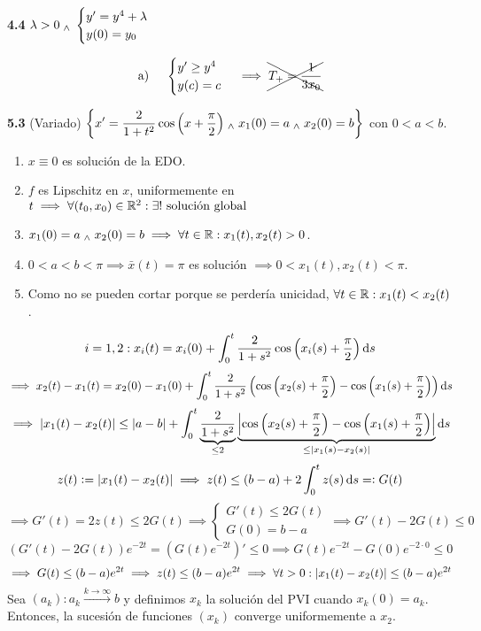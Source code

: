 \textbf{4.4} $\lambda > 0 \; _{\wedge} \; \begin{cases}
		y' = y^4 + \lambda \\
		y(0) = y_0
	\end{cases}$

\[\text{a) } \quad \begin{cases}
		y'\geq y^4 \\
		y(c) = c
	\end{cases} \implies \xcancel{T_+=\frac{1}{3x_0}}\]

\textbf{5.3} (Variado) $\displaystyle \left\{x'=\frac{2}{1+t^2} \cos{\left(x+ \frac{\pi}{2}\right)} \; _{\wedge} \; x_1(0)=a  \; _{\wedge} \; x_2(0)=b\right\}$ con $0 < a < b$.

\begin{enumerate}
	\item $x \equiv 0$ es solución de la EDO.
	\item $f$ es Lipschitz en $x$, uniformemente en $t \implies \forall (t_0, x_0) \in \mathbb{R}^2 : \exists ! \text{ solución global}$
	\item $x_1(0) = a \; _{\wedge} \; x_2(0) = b \implies \forall t \in \mathbb{R} : x_1(t) , x_2(t) > 0$.
	\item $0<a<b<\pi \implies \bar{x}(t)=\pi$ es solución $\implies 0<x_1(t), x_2(t)<\pi$.
	\item Como no se pueden cortar porque se perdería unicidad, $\forall t \in \mathbb{R} : x_1(t) < x_2(t)$.
\end{enumerate}
\[i = 1,2 : x_i(t) = x_i(0) + \int_{0}^{t} \frac{2}{1+s^2} \cos{\left(x_i(s)+\frac{\pi}{2}\right)} \odif{s}\]
\[\implies x_2(t) - x_1(t) =x_2(0) - x_1(0) + \int_{0}^{t} \frac{2}{1+s^2} \left(\cos{\left(x_2(s)+\frac{\pi}{2}\right)} - \cos{\left(x_1(s)+\frac{\pi}{2}\right)}\right) \odif{s}\]
\[\implies \abs{x_1(t) - x_2(t)} \leq \abs{a-b} + \int_{0}^{t} \underbrace{\frac{2}{1+s^2}}_{\leq 2} \underbrace{\abs{\cos{\left(x_2(s)+\frac{\pi}{2}\right)} - \cos{\left(x_1(s)+\frac{\pi}{2}\right)}}}_{\leq \abs{x_1(s) - x_2(s)}} \odif{s}\]
\[z(t) \defeq \abs{x_1(t) - x_2(t)} \implies z(t) \leq (b-a) + 2\int_{0}^{t} z(s)\odif{s} \eqdef G(t)\]
\[\implies G'(t) = 2 z(t) \leq 2 G(t) \implies \begin{cases}
		G'(t) \leq 2 G(t) \\
		G(0) = b-a
	\end{cases} \implies G'(t) - 2G(t) \leq 0\]
\[\left(G'(t) - 2G(t)\right) e^{-2t} = \left(G(t)e^{-2t}\right)' \leq 0 \implies G(t)e^{-2t} - G(0) e^{-2\cdot 0} \leq 0\]
\[\implies G(t) \leq (b-a)e^{2t} \implies z(t) \leq (b-a)e^{2t} \implies \forall t > 0 : \left|x_1(t) - x_2(t)\right| \leq (b-a) e^{2t}\]
Sea $\left(a_k\right): a_k \xrightarrow{k\to \infty} b$ y definimos $x_k$ la solución del PVI cuando $x_k(0)=a_k$.\\
Entonces, la sucesión de funciones $\left(x_k\right)$ converge uniformemente a $x_2$.

